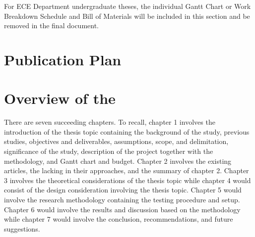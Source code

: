 For ECE Department undergraduate theses, the individual Gantt Chart or Work Breakdown Schedule and Bill of Materials will be included in this section and be removed in the final document.

\graytx{\blindtext}

\ifPhD
\section{Publication Plan}
\graytx{\blindtext}
\fi

\fi


\section{Overview of the \documentType}

There are seven succeeding chapters. To recall, chapter 1 involves the introduction of the
thesis topic containing the background of the study, previous studies, objectives and
deliverables, assumptions, scope, and delimitation, significance of the study, description
of the project together with the methodology, and Gantt chart and budget. Chapter 2
involves the existing articles, the lacking in their approaches, and the summary of
chapter 2. Chapter 3 involves the theoretical considerations of the thesis topic while
chapter 4 would consist of the design consideration involving the thesis topic. Chapter 5
would involve the research methodology containing the testing procedure and setup.
Chapter 6 would involve the results and discussion based on the methodology while
chapter 7 would involve the conclusion, recommendations, and future suggestions.
